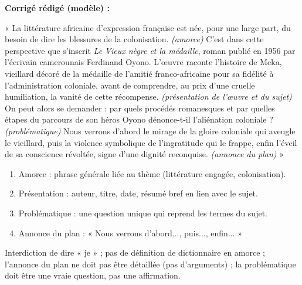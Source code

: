 \documentclass[11pt]{article}
\begin{document}
\begin{corrige}
\textbf{Corrigé rédigé (modèle) :}

« La littérature africaine d'expression française est née, pour une large part, du besoin de dire les blessures de la colonisation. \emph{(amorce)} C'est dans cette perspective que s'inscrit \emph{Le Vieux nègre et la médaille}, roman publié en 1956 par l'écrivain camerounais Ferdinand Oyono. L'œuvre raconte l'histoire de Meka, vieillard décoré de la médaille de l'amitié franco-africaine pour sa fidélité à l'administration coloniale, avant de comprendre, au prix d'une cruelle humiliation, la vanité de cette récompense. \emph{(présentation de l'œuvre et du sujet)} On peut alors se demander : par quels procédés romanesques et par quelles étapes du parcours de son héros Oyono dénonce-t-il l'aliénation coloniale ? \emph{(problématique)} Nous verrons d'abord le mirage de la gloire coloniale qui aveugle le vieillard, puis la violence symbolique de l'ingratitude qui le frappe, enfin l'éveil de sa conscience révoltée, signe d'une dignité reconquise. \emph{(annonce du plan)} »

\end{corrige}

\begin{methode}
\begin{enumerate}
\item Amorce : phrase générale liée au thème (littérature engagée, colonisation).
\item Présentation : auteur, titre, date, résumé bref en lien avec le sujet.
\item Problématique : une question unique qui reprend les termes du sujet.
\item Annonce du plan : « Nous verrons d'abord..., puis..., enfin... »
\end{enumerate}
\end{methode}

\begin{attention}
Interdiction de dire « je » ; pas de définition de dictionnaire en amorce ; l'annonce du plan ne doit pas être détaillée (pas d'arguments) ; la problématique doit être une vraie question, pas une affirmation.
\end{attention}
\end{document}
